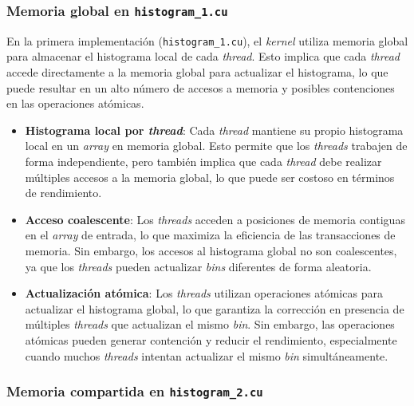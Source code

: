         \subsubsection{Memoria global en \texttt{histogram\_1.cu}}

            En la primera implementación (\texttt{histogram\_1.cu}), el \textit{kernel} utiliza memoria global para almacenar el histograma local de cada \textit{thread}. Esto implica que cada \textit{thread} accede directamente a la memoria global para actualizar el histograma, lo que puede resultar en un alto número de accesos a memoria y posibles contenciones en las operaciones atómicas.
            
            \begin{itemize}
            
                \item \textbf{Histograma local por \textit{thread}}: Cada \textit{thread} mantiene su propio histograma local en un \textit{array} en memoria global. Esto permite que los \textit{threads} trabajen de forma independiente, pero también implica que cada \textit{thread} debe realizar múltiples accesos a la memoria global, lo que puede ser costoso en términos de rendimiento.
                
                \item \textbf{Acceso coalescente}: Los \textit{threads} acceden a posiciones de memoria contiguas en el \textit{array} de entrada, lo que maximiza la eficiencia de las transacciones de memoria. Sin embargo, los accesos al histograma global no son coalescentes, ya que los \textit{threads} pueden actualizar \textit{bins} diferentes de forma aleatoria.
                
                \item \textbf{Actualización atómica}: Los \textit{threads} utilizan operaciones atómicas para actualizar el histograma global, lo que garantiza la corrección en presencia de múltiples \textit{threads} que actualizan el mismo \textit{bin}. Sin embargo, las operaciones atómicas pueden generar contención y reducir el rendimiento, especialmente cuando muchos \textit{threads} intentan actualizar el mismo \textit{bin} simultáneamente.
                
            \end{itemize}
                    
        \subsubsection{Memoria compartida en \texttt{histogram\_2.cu}}
        
